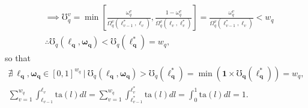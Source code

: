 \documentclass[hidelinks, nonatbib]{elsarticle}
\begin{document}
\begin{enumerate}
\begin{align}
        \\
        &\implies
        \mho_{q}^{v} = 
        \min\left[
            \frac{
                \omega_{q}^{v}
            }{
                \Omega_{q}^{v}(
                    \ell_{v-1}^{*}
                    ,\ell_{v}
                )
            }
            ,
            \frac{
                1-\omega_{q}^{v}
            }{
                \Omega_{q}^{v}(
                    \ell_{v}
                    ,\ell_{v}^{*}
                )
            }
        \right]
        =
        \frac{
            \omega_{q}^{v}
        }{
            \Omega_{q}^{v}(
                \ell_{v-1}^{*}
                ,\ell_{v}
            )
        }
        <
        w_q
        \\
        &\therefore
        \mho_{q}(
            \boldsymbol{\ell_q}
            ,\boldsymbol{\omega_q}
        ) 
        <
        \mho_{q}(
            \boldsymbol{\ell_{q}^{*}}
        )
        =
        w_q
        ,
    \end{align}
    so that 
    \begin{gather}
        \nexists
        \
        \boldsymbol{\ell_q}
        ,
        \boldsymbol{\omega_q}
        \in
        [0,1]^{w_q}
        \
        \big|
        \
        \mho_{q}(
            \boldsymbol{\ell_q}
            ,\boldsymbol{\omega_q}
        ) 
        >
        \mho_{q}(
            \boldsymbol{\ell_{q}^{*}}
        )
        =
        \min(
            \boldsymbol{1}
            \times
            \boldsymbol{\mho_q}(
                \boldsymbol{\ell_{q}^{*}}
            )
        )
        =
        w_q
        ,
        \\
        \sum_{v=1}^{w_q}
        \int_{
            \ell_{v-1}
        }^{
            \ell_{v}
        }
        \text{ta}(l)dl
        =
        \sum_{v=1}^{w_q}
        \int_{
            \ell_{v-1}^{*}
        }^{
            \ell_{v}^{*}
        }
        \text{ta}(l)dl
        =
        \int_{0}^{1}
        \text{ta}(l)dl
        =
        1
        .
    \end{gather}


\end{enumerate}
\end{document}
